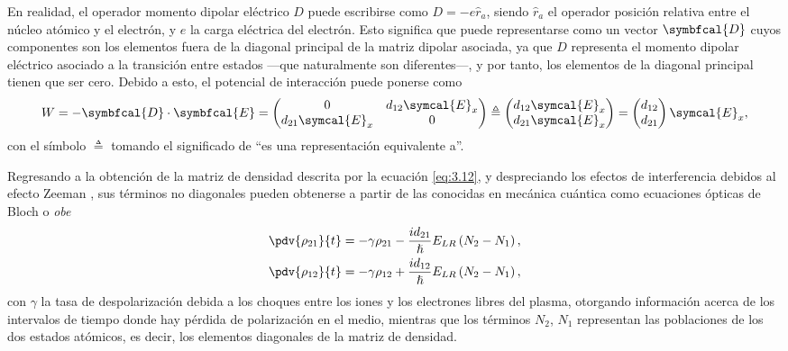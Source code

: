 En realidad, el operador momento dipolar eléctrico $D$ puede escribirse como $D = -e \hat{r}_{a}$, siendo $\hat{r}_{a}$ el operador posición relativa entre el núcleo atómico y el electrón, y $e$ la carga eléctrica del electrón. Esto significa que puede representarse como un vector $\symbfcal{D}$ cuyos componentes son los elementos fuera de la diagonal principal de la matriz dipolar asociada, ya que $D$ representa el momento dipolar eléctrico asociado a la transición entre estados ---que naturalmente son diferentes---, y por tanto, los elementos de la diagonal principal tienen que ser cero. Debido a esto, el potencial de interacción puede ponerse como
\begin{equation}
  W = -\symbfcal{D} \cdot \symbfcal{E} =  
  \begin{pmatrix}
    0 & d_{12}\symcal{E}_{x} \\
    d_{21}\symcal{E}_{x} & 0 
  \end{pmatrix} \triangleq
  \begin{pmatrix}
    d_{12}\symcal{E}_{x} \\
    d_{21}\symcal{E}_{x}
  \end{pmatrix} 
  =
  \begin{pmatrix}
    d_{12} \\
    d_{21}
  \end{pmatrix}
  \symcal{E}_{x},
\end{equation}
con el símbolo $\triangleq$ tomando el significado de \enquote{es una representación equivalente a}.

Regresando a la obtención de la matriz de densidad descrita por la ecuación \eqref{eq:3.12}, y despreciando los efectos de interferencia debidos al efecto Zeeman \autocite{Sureau1995}, sus términos no diagonales pueden obtenerse a partir de las conocidas en mecánica cuántica \autocite{Milonni1988} como ecuaciones ópticas de Bloch o \emph{\acrfull{obe}}
\begin{align}
  \label{eq:3.13a}
  \pdv{\rho_{21}}{t} &= -\gamma \rho_{21} - \frac{id_{21}}{\hslash }E_{LR}\left(N_{2}-N_{1}\right), \\
  \label{eq:3.13b}
  \pdv{\rho_{12}}{t} &= -\gamma \rho_{12} + \frac{id_{12}}{\hslash }E_{LR}\left(N_{2}-N_{1}\right),
\end{align}
con $\gamma$ la tasa de despolarización debida a los choques entre los iones y los electrones libres del plasma, otorgando información acerca de los intervalos de tiempo donde hay pérdida de polarización en el medio, mientras que los términos $N_{2}$, $N_{1}$ representan las poblaciones de los dos estados atómicos, es decir, los elementos diagonales de la matriz de densidad.

